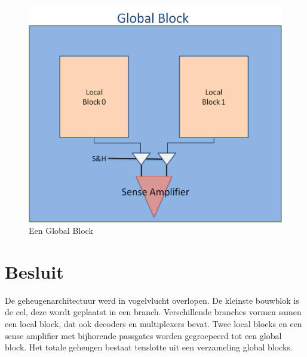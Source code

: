 \begin{figure}
  \centering
  \includegraphics[scale=0.3]{../fig/hfdstk-architecture-globalblock.png}
  \caption{Een Global Block}
  \label{fig:GB}
\end{figure}

\section{Besluit}
De geheugenarchitectuur werd in vogelvlucht overlopen. De kleinste bouwblok is de cel, deze wordt geplaatst in een branch. Verschillende branches vormen samen een local block, dat ook decoders en multiplexers bevat. Twee local blocks en een sense amplifier met bijhorende passgates worden gegroepeerd tot een global block. Het totale geheugen bestaat tenslotte uit een verzameling global blocks.

